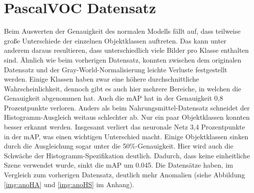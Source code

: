 \section{PascalVOC Datensatz}
Beim Auswerten der Genauigkeit des normalen Modells fällt auf, dass teilweise große Unterschiede der einzelnen Objektklassen auftreten. Das kann unter anderem daraus resultieren, dass unterschiedlich viele Bilder pro Klasse enthalten sind. Ähnlich wie beim vorherigen Datensatz, konnten zwischen dem originalen Datensatz und der Gray-World-Normalisierung leichte Verluste festgestellt werden. Einige Klassen haben zwar eine höhere durchschnittliche Wahrscheinlichkeit, dennoch gibt es auch hier mehrere Bereiche, in welchen die Genauigkeit abgenommen hat. Auch die mAP hat in der Genauigkeit 0,8 Prozentpunkte verloren. Anders als beim Nahrungsmittel-Datensatz schneidet der Histogramm-Ausgleich weitaus schlechter ab. Nur ein paar Objektklassen konnten besser erkannt werden. Insgesamt verliert das neuronale Netz 3,4 Prozentpunkte in der mAP, was einen wichtigen Unterschied macht. Einige Objektklassen sinken durch die Ausgleichung sogar unter die 50\%-Genauigkeit. Hier wird auch die Schwäche der Histogramm-Spezifikation deutlich. Dadurch, dass keine einheitliche Szene verwendet wurde, sinkt die mAP um 0.045. Die Datensätze haben, im Vergleich zum vorherigen Datensatz, deutlich mehr Anomalien (siehe Abbildung \ref{img:anoHA} und \ref{img:anoHS} im Anhang).
